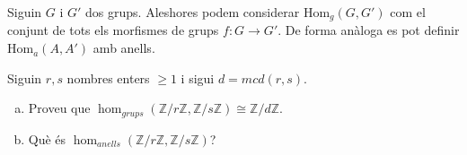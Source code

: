 \documentclass[../main.tex]{subfiles}
\begin{document}
\begin{sol}
\begin{enumerate}[(a)]
    
\end{enumerate}
\end{sol}


\begin{defi}
\label{def:grupmorfismes} Siguin $G$ i $G'$ dos grups. Aleshores podem considerar $\mathrm{Hom}_g(G,G')$ com el conjunt de tots els morfismes de grups $f:G\rightarrow G'$. De forma anàloga es pot definir $\mathrm{Hom}_a(A,A')$ amb anells.
\end{defi}


\setcounter{exercici}{22}
\begin{exercici}
\label{esal23} 
Siguin $r,s$ nombres enters $\geq 1$ i sigui $d = mcd(r,s)$.
\begin{enumerate}[(a)]
\item Proveu que $\hom_{grups}(\mathbb{Z}/r\mathbb{Z},\mathbb{Z}/s\mathbb{Z})\cong\mathbb{Z}/d\mathbb{Z}$.
\item Què és $\hom_{anells}(\mathbb{Z}/r\mathbb{Z},\mathbb{Z}/s\mathbb{Z})$?
\end{enumerate}
\end{exercici}
\end{document}
